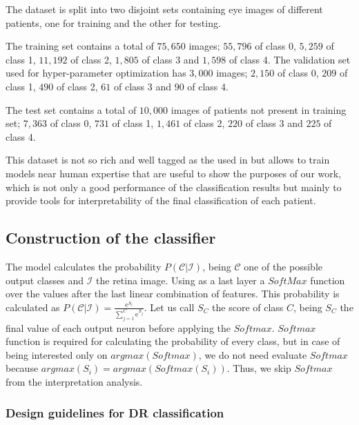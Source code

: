 \documentclass[review]{elsarticle}
\theoremstyle{definition} %
\theoremstyle{remark}
\newcommand{\me}{\mathrm{e}} %
\begin{document}
The dataset is split into two disjoint sets containing eye images of different patients, one for training and the other for testing.

The training set contains a total of $75,650$ images; $55,796$ of class 0, $5,259$ of class 1, $11,192$ of class 2, $1,805$ of class 3 and $1,598$ of class 4. The validation set used for hyper-parameter optimization has $3,000$ images; $2,150$ of class 0, $209$ of class 1, $490$ of class 2, $61$ of class 3 and $90$ of class 4. 

The test set contains a total of $10,000$ images of patients not present in training set; $7,363$ of class 0, $731$ of class 1, $1,461$ of class 2, $220$ of class 3 and $225$ of class 4. 

This dataset is not so rich and well tagged as the used in \cite{doi:10.1001/jama.2016.17216} but allows to train models near human expertise that are useful to show the purposes of our work, which is not only a good performance of the classification results but mainly to provide tools for interpretability of the final classification of each patient.

\subsection{Construction of the classifier}

The model calculates the probability $P(\mathcal{C} | \mathcal{I})$, being $\mathcal{C}$ one of the possible output classes and $\mathcal{I}$ the retina image. Using as a last layer a $SoftMax$ function over the values after the last linear combination of features. This probability is calculated as $P(\mathcal{C} | \mathcal{I}) = \frac{\me^{S_{i}}}{\sum_{j=1}^{C} \me^{S_{j}}}$. Let us call $S_{C}$ the score of class $C$, being $S_C$ the final value of each output neuron before applying the $Softmax$. $Softmax$ function is required for calculating the probability of every class, but in case of being interested only on $argmax(Softmax)$, we do not need evaluate $Softmax$ because $argmax(S_i) = argmax(Softmax(S_i))$. Thus, we skip $Softmax$ from the interpretation analysis.

\subsubsection{Design guidelines for DR classification}
\end{document}
